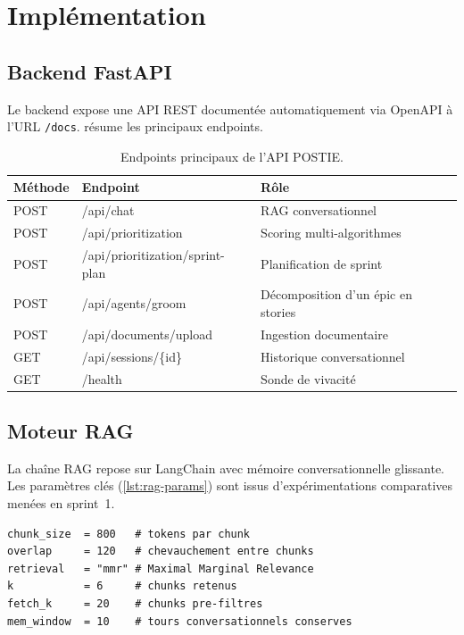 \chapter{Implémentation}
\label{ch:impl}

\section{Backend FastAPI}
Le backend expose une API REST documentée automatiquement via
OpenAPI à l'URL \texttt{/docs}.  résume les
principaux endpoints.

\begin{table}[H]\centering\small
\caption{Endpoints principaux de l'API POSTIE.}
\label{tab:endpoints}
\begin{tabularx}{\linewidth}{llX}
\toprule
\textbf{Méthode} & \textbf{Endpoint} & \textbf{Rôle}\\
\midrule
POST & /api/chat & RAG conversationnel\\
POST & /api/prioritization & Scoring multi-algorithmes\\
POST & /api/prioritization/sprint-plan & Planification de sprint\\
POST & /api/agents/groom & Décomposition d'un épic en stories\\
POST & /api/documents/upload & Ingestion documentaire\\
GET  & /api/sessions/\{id\} & Historique conversationnel\\
GET  & /health & Sonde de vivacité\\
\bottomrule
\end{tabularx}
\end{table}

\section{Moteur RAG}
La chaîne RAG repose sur LangChain avec mémoire conversationnelle
glissante. Les paramètres clés (\cref{lst:rag-params}) sont issus
d'expérimentations comparatives menées en sprint~1.

\begin{lstlisting}[caption={Paramètres du moteur RAG.},label={lst:rag-params}]
chunk_size  = 800   # tokens par chunk
overlap     = 120   # chevauchement entre chunks
retrieval   = "mmr" # Maximal Marginal Relevance
k           = 6     # chunks retenus
fetch_k     = 20    # chunks pre-filtres
mem_window  = 10    # tours conversationnels conserves
\end{lstlisting}

